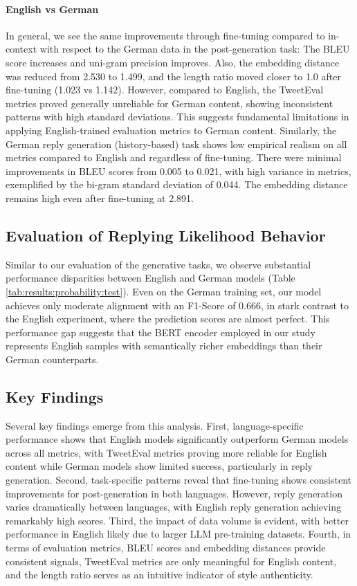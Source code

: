 \paragraph{English vs German}
In general, we see the same improvements through fine-tuning compared to in-context with respect to the German data in the post-generation task: The BLEU score increases and uni-gram precision improves. Also, the embedding distance was reduced from 2.530 to 1.499, and the length ratio moved closer to 1.0 after fine-tuning (1.023 vs 1.142). However, compared to English, the TweetEval metrics proved generally unreliable for German content, showing inconsistent patterns with high standard deviations. This suggests fundamental limitations in applying English-trained evaluation metrics to German content. Similarly, the German reply generation (history-based) task shows low empirical realism on all metrics compared to English and regardless of fine-tuning. There were minimal improvements in BLEU scores from 0.005 to 0.021, with high variance in metrics, exemplified by the bi-gram standard deviation of 0.044. The embedding distance remains high even after fine-tuning at 2.891.

\subsection{Evaluation of Replying Likelihood Behavior}
Similar to our evaluation of the generative tasks, we observe substantial performance disparities between English and German models (Table \ref{tab:results:probability:test}). Even on the German training set, our model achieves only moderate alignment with an F1-Score of $0.666$, in stark contrast to the English experiment, where the prediction scores are almost perfect. This performance gap suggests that the BERT encoder employed in our study represents English samples with semantically richer embeddings than their German counterparts. 



\subsection{Key Findings}
Several key findings emerge from this analysis. First, language-specific performance shows that English models significantly outperform German models across all metrics, with TweetEval metrics proving more reliable for English content while German models show limited success, particularly in reply generation. Second, task-specific patterns reveal that fine-tuning shows consistent improvements for post-generation in both languages. However, reply generation varies dramatically between languages, with English reply generation achieving remarkably high scores. Third, the impact of data volume is evident, with better performance in English likely due to larger LLM pre-training datasets. Fourth, in terms of evaluation metrics, BLEU scores and embedding distances provide consistent signals, TweetEval metrics are only meaningful for English content, and the length ratio serves as an intuitive indicator of style authenticity.

